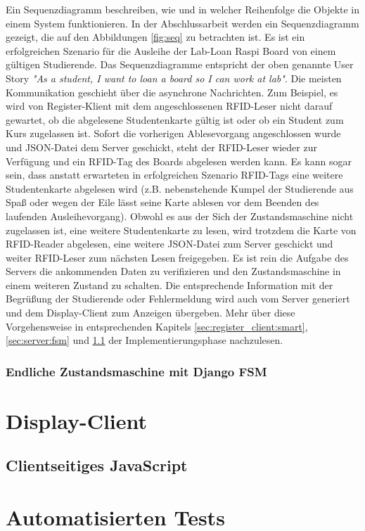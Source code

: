 Ein Sequenzdiagramm beschreiben, wie und in welcher Reihenfolge die Objekte in einem System funktionieren. In der Abschlussarbeit werden ein Sequenzdiagramm gezeigt, die auf den Abbildungen \ref{fig:seq} zu betrachten ist. Es ist ein erfolgreichen Szenario für die Ausleihe der Lab-Loan Raspi Board von einem gültigen Studierende. Das Sequenzdiagramme entspricht der oben genannte User Story \textit{"As a student, I want to loan a board so I can work at lab"}. Die meisten Kommunikation geschieht über die asynchrone Nachrichten. Zum Beispiel, es wird von Register-Klient mit dem angeschlossenen RFID-Leser nicht darauf gewartet, ob die abgelesene Studentenkarte gültig ist oder ob ein Student zum Kurs zugelassen ist. Sofort die vorherigen Ablesevorgang angeschlossen wurde und JSON-Datei dem Server geschickt, steht der RFID-Leser wieder zur Verfügung und ein RFID-Tag des Boards abgelesen werden kann. Es kann sogar sein, dass anstatt erwarteten in erfolgreichen Szenario RFID-Tags eine weitere Studentenkarte abgelesen wird (z.B. nebenstehende Kumpel der Studierende aus Spaß oder wegen der Eile lässt seine Karte ablesen vor dem Beenden des laufenden Ausleihevorgang). Obwohl es aus der Sich der Zustandsmaschine nicht zugelassen ist, eine weitere Studentenkarte zu lesen, wird trotzdem die Karte von RFID-Reader abgelesen, eine weitere JSON-Datei zum Server geschickt und weiter RFID-Leser zum nächsten Lesen freigegeben. Es ist rein die Aufgabe des Servers die ankommenden Daten zu verifizieren und den Zustandsmaschine in einem weiteren Zustand zu schalten. Die entsprechende Information mit der Begrüßung der Studierende oder Fehlermeldung wird auch vom Server generiert und dem Display-Client zum Anzeigen übergeben. Mehr über diese Vorgehensweise in entsprechenden Kapitels \ref{sec:register_client:smart}, \ref{sec:server:fsm} und \ref*{sec:display_client:js} der Implementierungsphase nachzulesen. 

\subsubsection{Endliche Zustandsmaschine mit Django FSM}
\label{sec:server:fsm:fsm}


\section{Display-Client}
\label{sec:display_client}

\subsection{Clientseitiges JavaScript}
\label{sec:display_client:js}


\section{Automatisierten Tests}
\label{sec:testing}